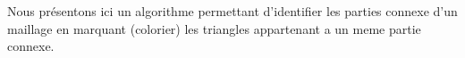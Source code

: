 Nous présentons ici un algorithme permettant d'identifier les parties connexe d'un maillage en marquant (colorier) les triangles appartenant a un meme partie connexe.




